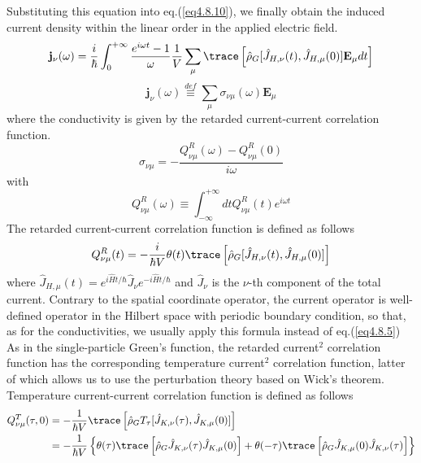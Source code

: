 Substituting this equation into eq.(\ref{eq4.8.10}), we finally obtain the induced current density within the linear order in the applied electric field.
\begin{equation}
\mathbf j_\nu(\omega)=\frac{i}{\hbar}\int_0^{+\infty} \frac{e^{i\omega t}-1}{\omega}\frac{1}{V} \sum_\mu \trace \left[ \hat \rho_G[\hat J_{H,\nu}(t),\hat J_{H,\mu}(0)] \mathbf E_\mu dt \right]
\end{equation}
\begin{equation}
\mathbf j_\nu (\omega)\overset{def}{\equiv} \sum_\mu \sigma_{\nu\mu}(\omega)\mathbf E_\mu
\end{equation}
where the conductivity is given by the retarded current-current correlation function.
\begin{equation}
\sigma_{\nu\mu}=-\frac{Q^R_{\nu\mu}(\omega)-Q^R_{\nu\mu}(0)}{i\omega}
\end{equation}
with
\begin{equation}
Q^R_{\nu\mu}(\omega)\equiv \int_{-\infty}^{+\infty} dt Q^R_{\nu\mu}(t)e^{i\omega t}
\end{equation}
 The retarded current-current correlation function is defined as follows
\begin{equation}
Q^R_{\nu\mu}(t)=-\frac{i}{\hbar V}\theta(t)\trace \left[ \hat \rho_G[\hat J_{H,\nu}(t),\hat J_{H,\mu}(0)] \right]
\end{equation}
 where $\hat J_{H,\mu}(t)=e^{i\hat Ht/\hbar} \hat J_\nu e^{-i\hat Ht/\hbar}$ and $\hat J_\nu$ is the $\nu$-th component of the total current.
 Contrary to the spatial coordinate operator, the current operator is well-defined operator in the Hilbert space with periodic boundary condition, so that, as for the conductivities, we usually apply this formula instead of eq.(\ref{eq4.8.5})
 As in the single-particle Green's function, the retarded current$^2$ correlation function has the corresponding temperature current$^2$ correlation function, latter of which allows us to use the perturbation theory based on Wick's theorem.
 Temperature current-current correlation function is defined as follows
\begin{equation}
\begin{aligned}
Q^T_{\nu\mu}(\tau,0)&=-\frac{1}{\hbar V} \trace \left[ \hat \rho_G T_\tau[\hat J_{K,\nu}(\tau),\hat J_{K,\mu}(0)] \right]\\
&=-\frac{1}{\hbar V}\left\{ \theta(\tau) \trace\left[ \hat \rho_G \hat J_{K,\nu}(\tau) \hat J_{K,\mu}(0) \right] + \theta(-\tau) \trace\left[ \hat \rho_G \hat J_{K,\mu}(0) \hat J_{K,\nu}(\tau) \right]\right\}
\end{aligned}
\end{equation}

